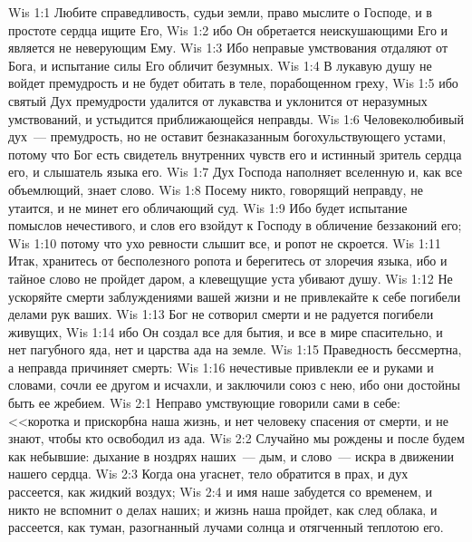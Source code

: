 \vs Wis 1:1 Любите справедливость, судьи земли, право мыслите о Господе, и в простоте сердца ищите Его,
\vs Wis 1:2 ибо Он обретается неискушающими Его и является не неверующим Ему.
\vs Wis 1:3 Ибо неправые умствования отдаляют от Бога, и испытание силы Его обличит безумных.
\vs Wis 1:4 В лукавую душу не войдет премудрость и не будет обитать в теле, порабощенном греху,
\vs Wis 1:5 ибо святый Дух премудрости удалится от лукавства и уклонится от неразумных умствований, и устыдится приближающейся неправды.
\vs Wis 1:6 Человеколюбивый дух~--- премудрость, но не оставит безнаказанным богохульствующего устами, потому что Бог есть свидетель внутренних чувств его и истинный зритель сердца его, и слышатель языка его.
\vs Wis 1:7 Дух Господа наполняет вселенную и, как все объемлющий, знает  слово.
\vs Wis 1:8 Посему никто, говорящий неправду, не утаится, и не минет его обличающий суд.
\vs Wis 1:9 Ибо будет испытание помыслов нечестивого, и слов его взойдут к Господу в обличение беззаконий его;
\vs Wis 1:10 потому что ухо ревности слышит все, и ропот не скроется.
\vs Wis 1:11 Итак, хранитесь от бесполезного ропота и берегитесь от злоречия языка, ибо и тайное слово не пройдет даром, а клевещущие уста убивают душу.
\vs Wis 1:12 Не ускоряйте смерти заблуждениями вашей жизни и не привлекайте к себе погибели делами рук ваших.
\vs Wis 1:13 Бог не сотворил смерти и не радуется погибели живущих,
\vs Wis 1:14 ибо Он создал все для бытия, и все в мире спасительно, и нет пагубного яда, нет и царства ада на земле.
\vs Wis 1:15 Праведность бессмертна, а неправда причиняет смерть:
\vs Wis 1:16 нечестивые привлекли ее и руками и словами, сочли ее другом и исчахли, и заключили союз с нею, ибо они достойны быть ее жребием.
\vs Wis 2:1 Неправо умствующие говорили сами в себе: <<коротка и прискорбна наша жизнь, и нет человеку спасения от смерти, и не знают, чтобы кто освободил из ада.
\vs Wis 2:2 Случайно мы рождены и после будем как небывшие: дыхание в ноздрях наших~--- дым, и слово~--- искра в движении нашего сердца.
\vs Wis 2:3 Когда она угаснет, тело обратится в прах, и дух рассеется, как жидкий воздух;
\vs Wis 2:4 и имя наше забудется со временем, и никто не вспомнит о делах наших; и жизнь наша пройдет, как след облака, и рассеется, как туман, разогнанный лучами солнца и отягченный теплотою его.
